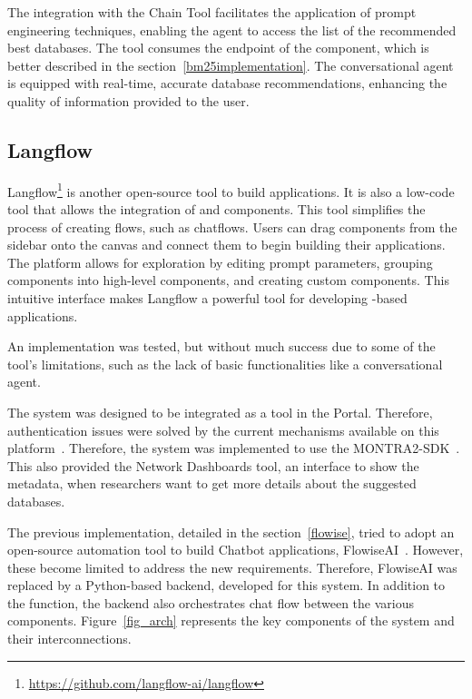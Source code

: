 The integration with the Chain Tool facilitates the application of prompt engineering techniques, enabling the agent to access the list of the recommended best databases. The tool consumes the endpoint of the {\ir} component, which is better described in the section~\ref{bm25implementation}. The conversational agent is equipped with real-time, accurate database recommendations, enhancing the quality of information provided to the user. 


\subsection{Langflow}

Langflow\footnote{\url{https://github.com/langflow-ai/langflow}} is another open-source tool to build {\ai} applications. It is also a low-code tool that allows the integration of {\llm} and {\ai} components. This tool simplifies the process of creating flows, such as chatflows. Users can drag components from the sidebar onto the canvas and connect them to begin building their applications. The platform allows for exploration by editing prompt parameters, grouping components into high-level components, and creating custom components. This intuitive interface makes Langflow a powerful tool for developing {\llm}-based applications.

An implementation was tested, but without much success due to some of the tool's limitations, such as the lack of basic functionalities like a conversational agent.

 




The system was designed to be integrated as a tool in the {\ehden} Portal. Therefore, authentication issues were solved by the current mechanisms available on this platform~\cite{almeida2024federated}. Therefore, the system was implemented to use the MONTRA2-SDK~\cite{almeida2024montra2}. This also provided the Network Dashboards tool, an interface to show the metadata, when researchers want to get more details about the suggested databases. 

The previous implementation, detailed in the section~\ref{flowise}, tried to adopt an open-source automation tool to build Chatbot applications, FlowiseAI~\cite{reis2024flowise}. However, these become limited to address the new requirements. Therefore, FlowiseAI was replaced by a Python-based backend, developed for this system. In addition to the {\ir} function, the backend also orchestrates chat flow between the various components. Figure~\ref{fig_arch} represents the key components of the system and their interconnections.

